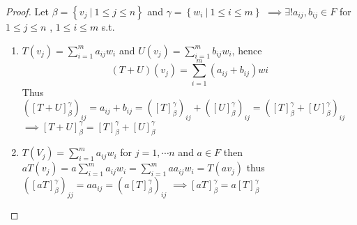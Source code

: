\begin{proof}
	Let $\beta = \left\{v_j \ |\ 1 \leq j\leq n \right\} $ and $\gamma = \left\{ w_i\ |\ 1\leq i\leq m \right \} $ $\implies\exists ! a_{ij} , b_{ij} \in F$ for $1\leq j \leq n $ , $1\leq i \leq m$ s.t. 

\begin{enumerate}
	\item $T(v_j) = \sum_{i = 1}^m a_{ij}w_i$ and $U(v_{j}) = \sum_{i = 1}^m b_{ij} w_i $, hence 
	$$\left(T+ U \right)(v_j) = \sum_{i=1}^m(a_{ij} + b_
		{ij})wi $$
	Thus $\left([T+U]_{\beta}^{\gamma}\right)_{i j}=a_{i j}+b_{i j}=\left([T]_{\beta}^{\gamma}\right)_{i j}+\left([U]_{\beta}^{\gamma}\right)_{i j}=\left([T]_{\beta}^{\gamma}+[U]_{\beta}^{\gamma}\right)_{i j}$
$\implies [T+U]_{\beta}^{\gamma}=[T]_{\beta}^{\gamma}+[U]_{\beta}^{\gamma}$
	\item $T\left(V_{j}\right)=\sum_{i=1}^{m} a_{i j} w_{i}$ for $j=1 , \cdots n $ and $ a \in F$ then
$ a T\left(v_{j}\right) = a \sum_{i=1}^{m} a_{i j} w_{i}=\sum_{i=1}^{m} a a_{i j} w_{i} = T\left(a v_{j} \right)$
thus
$\left([a T]_{\beta}^{\gamma}\right)_{j j}=a a_{i j}=\left(a[T]_{\beta}^{\gamma}\right)_{i j}$
$\implies [a T]_{\beta}^{\gamma} = a[T]_{\beta}^{\gamma}$

\end{enumerate} 
\end{proof}

